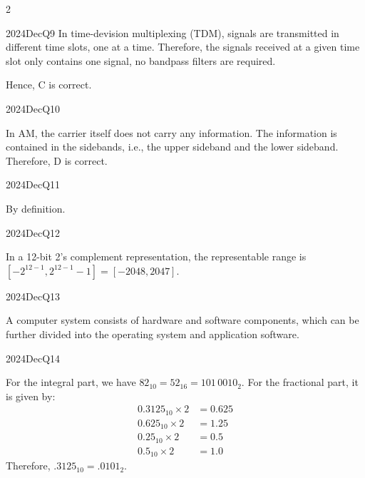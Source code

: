 \begin{multicols}{2}
\begin{qsolution}{2024}{Dec}{Q9}{\tgElectronics \tgElectronicsMultiplexing}
    In time-devision multiplexing (TDM), signals are transmitted in different time slots, one at a time.
    Therefore, the signals received at a given time slot only contains one signal, no bandpass filters are required.

    Hence, C is correct.
\end{qsolution}

\begin{qsolution}{2024}{Dec}{Q10}{\tgElectronics \tgElectronicsAM}

    In AM, the carrier itself does not carry any information.
    The information is contained in the sidebands, i.e., the upper sideband and the lower sideband.
    Therefore, D is correct.
\end{qsolution}

\begin{qsolution}{2024}{Dec}{Q11}{\tgCE \tgCEEmbeddedSystems}

    By definition.
\end{qsolution}

\begin{qsolution}{2024}{Dec}{Q12}{\tgCE \tgCETwosComplement}
    
    In a 12-bit 2's complement representation, the representable range is $[-2^{12-1}, 2^{12-1}-1]=[-2048, 2047]$.
\end{qsolution}

\begin{qsolution}{2024}{Dec}{Q13}{\tgCE \tgCEComputerOrganisation}

    A computer system consists of hardware and software components, which can be further divided into the operating system and application software.
\end{qsolution}

\begin{qsolution}{2024}{Dec}{Q14}{\tgCE \tgCEFixedPointRepr}
    
    For the integral part, we have $82_{10}=52_{16}=101\,0010_2$.
    For the fractional part, it is given by:
    \begin{align*}
        0.3125_{10} \times 2 &= \boxed{0}.625 \\
        0.625_{10} \times 2 &= \boxed{1}.25 \\
        0.25_{10} \times 2 &= \boxed{0}.5 \\
        0.5_{10} \times 2 &= \boxed{1}.0
    \end{align*}
    Therefore, $.3125_{10}=.0101_2$.


\end{qsolution}
\end{multicols}
